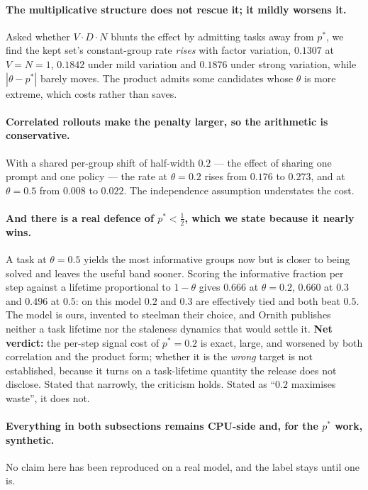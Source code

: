 \paragraph{The multiplicative structure does not rescue it; it mildly worsens it.} Asked
whether $V\!\cdot\!D\!\cdot\!N$ blunts the effect by admitting tasks away from $p^*$, we
find the kept set's constant-group rate \emph{rises} with factor variation, $0.1307$ at
$V=N=1$, $0.1842$ under mild variation and $0.1876$ under strong variation, while
$|\theta-p^*|$ barely moves. The product admits some candidates whose $\theta$ is more
extreme, which costs rather than saves.

\paragraph{Correlated rollouts make the penalty larger, so the arithmetic is conservative.}
With a shared per-group shift of half-width $0.2$ --- the effect of sharing one prompt and
one policy --- the rate at $\theta=0.2$ rises from $0.176$ to $0.273$, and at $\theta=0.5$
from $0.008$ to $0.022$. The independence assumption understates the cost.

\paragraph{And there is a real defence of $p^*<\tfrac12$, which we state because it nearly
wins.} A task at $\theta=0.5$ yields the most informative groups now but is closer to being
solved and leaves the useful band sooner. Scoring the informative fraction per step against
a lifetime proportional to $1-\theta$ gives $0.666$ at $\theta=0.2$, $0.660$ at $0.3$ and
$0.496$ at $0.5$: on this model $0.2$ and $0.3$ are effectively tied and both beat $0.5$.
The model is ours, invented to steelman their choice, and Ornith publishes neither a task
lifetime nor the staleness dynamics that would settle it. \textbf{Net verdict:} the
per-step signal cost of $p^*=0.2$ is exact, large, and worsened by both correlation and the
product form; whether it is the \emph{wrong} target is not established, because it turns on
a task-lifetime quantity the release does not disclose. Stated that narrowly, the criticism
holds. Stated as ``$0.2$ maximises waste'', it does not.

\paragraph{Everything in both subsections remains CPU-side and, for the $p^*$ work,
synthetic.} No claim here has been reproduced on a real model, and the label stays until
one is.

